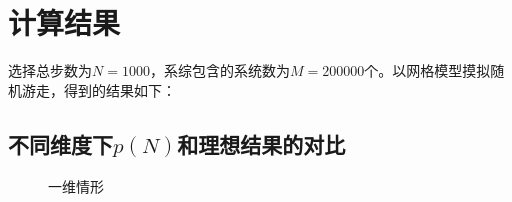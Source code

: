 \documentclass[UTF8]{ctexart}
\begin{document}
	\section{计算结果}

	
			\begin{flushleft}
				选择总步数为$N=1000$，系综包含的系统数为$M=200000$个。以网格模型摸拟随机游走，得到的结果如下：
			\end{flushleft}


	
	\subsection{不同维度下$p(N)$和理想结果的对比}
%	
			\begin{figure}[H]
					\centering  %
					\caption{一维情形}
				\end{figure}
		\clearpage	
\end{document}
